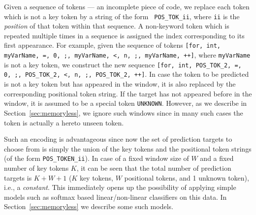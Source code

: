 Given a sequence of tokens --- an incomplete piece of code, we replace each
token which is not a key token by a string of the form {\tt
POS\_TOK\_ii}, where {\tt ii} is the {\it position} of that token
within that sequence. A non-keyword token which is repeated multiple times in a
sequence is assigned the index corresponding to its first appearance. For
example, given the sequence of tokens {\tt[for, int, myVarName, =, 0, ;,
myVarName, <, n, ;, myVarName, ++]}, where {\tt myVarName} is not a key token,
we construct the new sequence {\tt[for, int, POS\_TOK\_2, =, 0, ;, POS\_TOK\_2,
<, n, ;, POS\_TOK\_2, ++]}. In case the token to be predicted is not a key token
but has appeared in the window, it is also replaced by the corresponding
positional token string. If the target has not appeared before in the window, it
is assumed to be a special token {\tt UNKNOWN}. However, as we describe in
Section~\ref{sec:memoryless}, we ignore such windows since in many such
cases the token is actually a hereto unseen token.

Such an encoding is advantageous since now the set of prediction targets to
choose from is simply the union of the key tokens and the positional token
strings (of the form {\tt POS\_TOKEN\_ii}). In case of a fixed window size of
$W$ and a fixed number of key tokens $K$, it can be seen that the total number
of prediction targets is $K+W+1$ ($K$ key tokens, $W$ positional tokens, and 1
unknown token), i.e., a {\it constant}. This immediately opens up the
possibility of applying simple models such as softmax based linear/non-linear
classifiers on this data. In Section~\ref{sec:memoryless} we describe some such
models.
